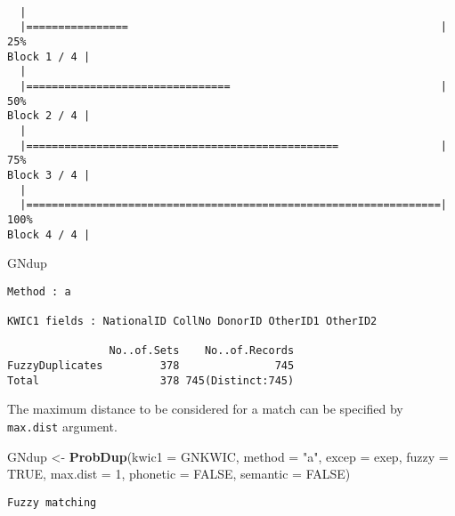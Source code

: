 \documentclass[]{article}
\newenvironment{Shaded}{\begin{snugshade}}{\end{snugshade}}
\newcommand{\DataTypeTok}[1]{\textcolor[rgb]{0.13,0.29,0.53}{#1}}
\newcommand{\DecValTok}[1]{\textcolor[rgb]{0.00,0.00,0.81}{#1}}
\newcommand{\KeywordTok}[1]{\textcolor[rgb]{0.13,0.29,0.53}{\textbf{#1}}}
\newcommand{\NormalTok}[1]{#1}
\newcommand{\OtherTok}[1]{\textcolor[rgb]{0.56,0.35,0.01}{#1}}
\newcommand{\StringTok}[1]{\textcolor[rgb]{0.31,0.60,0.02}{#1}}
\begin{document}
\begin{verbatim}

  |                                                                       
  |================                                                 |  25%
Block 1 / 4 |
  |                                                                       
  |================================                                 |  50%
Block 2 / 4 |
  |                                                                       
  |=================================================                |  75%
Block 3 / 4 |
  |                                                                       
  |=================================================================| 100%
Block 4 / 4 |
\end{verbatim}

\begin{Shaded}
\begin{Highlighting}[]
\NormalTok{GNdup}
\end{Highlighting}
\end{Shaded}

\begin{verbatim}
Method : a

KWIC1 fields : NationalID CollNo DonorID OtherID1 OtherID2
 
                No..of.Sets    No..of.Records
FuzzyDuplicates         378               745
Total                   378 745(Distinct:745)
\end{verbatim}

The maximum distance to be considered for a match can be specified by
\texttt{max.dist} argument.

\begin{Shaded}
\begin{Highlighting}[]
\NormalTok{GNdup <-}\StringTok{ }\KeywordTok{ProbDup}\NormalTok{(}\DataTypeTok{kwic1 =}\NormalTok{ GNKWIC, }\DataTypeTok{method =} \StringTok{"a"}\NormalTok{, }\DataTypeTok{excep =}\NormalTok{ exep, }
                 \DataTypeTok{fuzzy =} \OtherTok{TRUE}\NormalTok{, }\DataTypeTok{max.dist =} \DecValTok{1}\NormalTok{,}
                 \DataTypeTok{phonetic =} \OtherTok{FALSE}\NormalTok{, }\DataTypeTok{semantic =} \OtherTok{FALSE}\NormalTok{)}
\end{Highlighting}
\end{Shaded}

\begin{verbatim}
Fuzzy matching
\end{verbatim}
\end{document}
